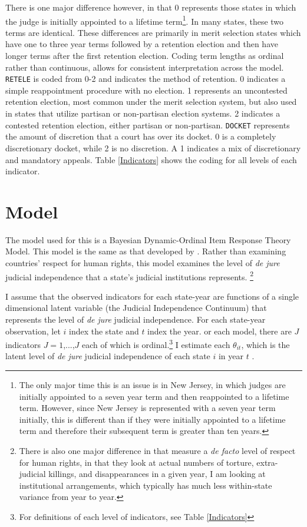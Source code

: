 \documentclass[12pt]{article}
\begin{document}
There is one major difference however, in that 0 represents those states in which the judge is initially appointed to a lifetime term\footnote{The only major time this is an issue is in New Jersey, in which judges are initially appointed to a seven year term and then reappointed to a lifetime term.  However, since New Jersey is represented with a seven year term initially, this is different than if they were initially appointed to a lifetime term and therefore their subsequent term is greater than ten years.}.  In many states, these two terms are identical.  These differences are primarily in merit selection states which have one to three year terms followed by a retention election and then have longer terms after the first retention election.  Coding term lengths as ordinal rather than continuous, allows for consistent interpretation across the model.  \texttt{RETELE} is coded from 0-2 and indicates the method of retention.  0 indicates a simple reappointment procedure with no election.  1 represents an uncontested retention election, most common under the merit selection system, but also used in states that utilize partisan or non-partisan election systems.  2 indicates a contested retention election, either partisan or non-partisan.  \texttt{DOCKET} represents the amount of discretion that a court has over its docket.  0 is a completely discretionary docket, while 2 is no discretion.  A 1 indicates a mix of discretionary and mandatory appeals. Table \ref{Indicators} shows the coding for all levels of each indicator. 

\section{Model}\label{Model}
The model used for this is a Bayesian Dynamic-Ordinal Item Response Theory Model.  This model is the same as that developed by \citet{Schnakenberg2014}.  Rather than examining countries' respect for human rights, this model examines the level of \textit{de jure} judicial independence that a state's judicial institutions represents. \footnote{There is also one major difference in that \citeauthor{Schnakenberg2014} measure a \textit{de facto} level of respect for human rights, in that they look at actual numbers of torture, extra-judicial killings, and disappearances in a given year, I am looking at institutional arrangements, which typically has much less within-state variance from year to year.}	

I assume that the observed indicators for each state-year are functions of a single dimensional latent variable (the Judicial Independence Continuum) that represents the level of \textit{de jure} judicial independence.  For each state-year observation, let $i$ index the state and $t$ index the year.  or each model, there are $J$ indicators $J=1$,...,$J$ each of which is ordinal.\footnote{For definitions of each level of indicators, see Table \ref{Indicators}} I estimate each $\theta_{it}$, which is the latent level of \textit{de jure} judicial independence of each state $i$ in year $t$ \citep[7]{Schnakenberg2014}.
\end{document}
